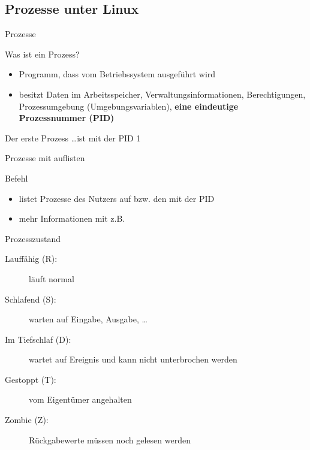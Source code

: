 \documentclass[aspectratio=43]{beamer}
\begin{document}
\subsection{Prozesse unter Linux}
\begin{frame}{Prozesse}
  \begin{block}{Was ist ein Prozess?}
    \begin{itemize}
      \item Programm, dass vom Betriebssystem ausgeführt wird
      \item besitzt Daten im Arbeitsspeicher, Verwaltungsinformationen, Berechtigungen,
            Prozessumgebung (Umgebungsvariablen), \textbf{eine eindeutige Prozessnummer (PID)}
    \end{itemize}
  \end{block}
  \begin{exampleblock}{Der erste Prozess}
    \dots ist  mit der PID 1
  \end{exampleblock}
\end{frame}
\begin{frame}{Prozesse mit  auflisten}
  \begin{block}{Befehl }
    \begin{itemize}
      \item listet Prozesse des Nutzers auf bzw. den mit der PID
      \item mehr Informationen mit z.B. 
    \end{itemize}
  \end{block}
  \begin{block}{Prozesszustand}
    \begin{description}
      \item[Lauffähig (R):]     läuft normal
      \item[Schlafend (S):]     warten auf Eingabe, Ausgabe, \dots
      \item[Im Tiefschlaf (D):] wartet auf Ereignis und kann nicht unterbrochen werden
      \item[Gestoppt (T):]      vom Eigentümer angehalten
      \item[Zombie (Z):]        Rückgabewerte müssen noch gelesen werden
    \end{description}
  \end{block}
\end{frame}
\end{document}
